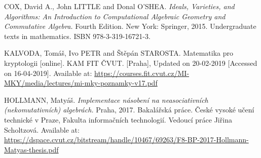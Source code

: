 \begin{thebibliography}{10}


 {COX, David A., John LITTLE and Donal O'SHEA. \textit{Ideals, Varieties, and Algorithms: An Introduction to Computational Algebraic Geometry and Commutative Algebra.} Fourth Edition. New York: Springer, 2015. Undergraduate texts in mathematics. ISBN 978-3-319-16721-3.}

 {KALVODA, Tomáš, Ivo PETR and Štěpán STAROSTA. Matematika pro kryptologii [online]. KAM FIT ČVUT. [Praha], Updated on 20-02-2019 [Accessed on 16-04-2019]. Available at: \url{https://courses.fit.cvut.cz/MI-MKY/media/lectures/mi-mky-poznamky-v17.pdf}}

 {HOLLMANN, Matyáš. \textit{Implementace násobení na neasociativních (nekomutativních) algebrách.} Praha, 2017. Bakalářská práce. České vysoké učení technické v Praze, Fakulta informačních technologií. Vedoucí práce Jiřina Scholtzová. Available at: \url{https://dspace.cvut.cz/bitstream/handle/10467/69263/F8-BP-2017-Hollmann-Matyas-thesis.pdf}}




\end{thebibliography}